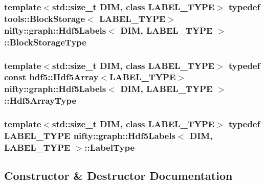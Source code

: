 \subsubsection[{Block\+Storage\+Type}]{\setlength{\rightskip}{0pt plus 5cm}template$<$std\+::size\+\_\+t D\+I\+M, class L\+A\+B\+E\+L\+\_\+\+T\+Y\+P\+E$>$ typedef {\bf tools\+::\+Block\+Storage}$<$ L\+A\+B\+E\+L\+\_\+\+T\+Y\+P\+E$>$ {\bf nifty\+::graph\+::\+Hdf5\+Labels}$<$ D\+I\+M, L\+A\+B\+E\+L\+\_\+\+T\+Y\+P\+E $>$\+::{\bf Block\+Storage\+Type}}\label{classnifty_1_1graph_1_1Hdf5Labels_abfffba953f16947d3907634b3aabdcad}
\hypertarget{classnifty_1_1graph_1_1Hdf5Labels_a2cfeca010fa78ee8fdfa1767ae0fbe4a}{}
\subsubsection[{Hdf5\+Array\+Type}]{\setlength{\rightskip}{0pt plus 5cm}template$<$std\+::size\+\_\+t D\+I\+M, class L\+A\+B\+E\+L\+\_\+\+T\+Y\+P\+E$>$ typedef const hdf5\+::\+Hdf5\+Array$<$L\+A\+B\+E\+L\+\_\+\+T\+Y\+P\+E$>$ {\bf nifty\+::graph\+::\+Hdf5\+Labels}$<$ D\+I\+M, L\+A\+B\+E\+L\+\_\+\+T\+Y\+P\+E $>$\+::{\bf Hdf5\+Array\+Type}}\label{classnifty_1_1graph_1_1Hdf5Labels_a2cfeca010fa78ee8fdfa1767ae0fbe4a}
\hypertarget{classnifty_1_1graph_1_1Hdf5Labels_a478cbee39d8a05949fe2fe4f9dd4f382}{}
\subsubsection[{Label\+Type}]{\setlength{\rightskip}{0pt plus 5cm}template$<$std\+::size\+\_\+t D\+I\+M, class L\+A\+B\+E\+L\+\_\+\+T\+Y\+P\+E$>$ typedef L\+A\+B\+E\+L\+\_\+\+T\+Y\+P\+E {\bf nifty\+::graph\+::\+Hdf5\+Labels}$<$ D\+I\+M, L\+A\+B\+E\+L\+\_\+\+T\+Y\+P\+E $>$\+::{\bf Label\+Type}}\label{classnifty_1_1graph_1_1Hdf5Labels_a478cbee39d8a05949fe2fe4f9dd4f382}


\subsection{Constructor \& Destructor Documentation}
\hypertarget{classnifty_1_1graph_1_1Hdf5Labels_aeaa1ed4dc0066a4c0ee0d176a55c3dd3}{}
